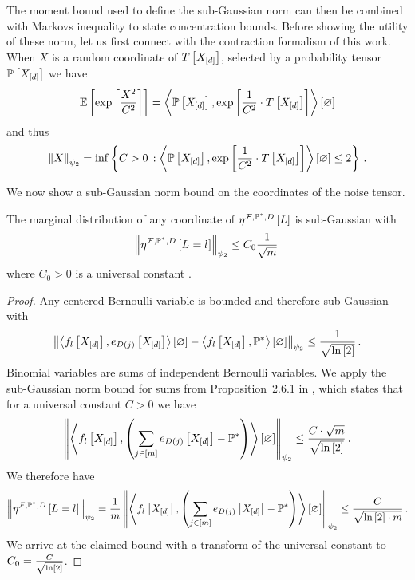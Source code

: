 The moment bound used to define the sub-Gaussian norm can then be combined with Markovs inequality to state concentration bounds.
Before showing the utility of these norm, let us first connect with the contraction formalism of this work.
When $X$ is a random coordinate of $T\left[X_{[d]}\right]$, selected by a probability tensor $\mathbb{P}\left[X_{[d]}\right]$ we have
\begin{align*}
    \mathbb{E}\left[\mathrm{exp}\left[\frac{X^2}{C^2}\right]\right]
    = \left\langle \mathbb{P}\left[X_{[d]}\right],\mathrm{exp}\left[\frac{1}{C^2}\cdot T\left[X_{[d]}\right]\right]\right\rangle \left[ \varnothing \right]
\end{align*}
and thus
\begin{align*}
    \left\|X\right\|_{\psi_2} = \inf \left\{ C > 0 \, : \left\langle \mathbb{P}\left[X_{[d]}\right],\mathrm{exp}\left[\frac{1}{C^2}\cdot T\left[X_{[d]}\right]\right]\right\rangle \left[ \varnothing \right] \leq 2 \right\} \, .
\end{align*}

We now show a sub-Gaussian norm bound on the coordinates of the noise tensor.

\begin{lemma}
    \label{lem:mlnMeanSubGaussianCoordinates}
    The marginal distribution of any coordinate of $\eta^{\mathcal{F},\mathbb{P}^*,D}\left[L\right]$ is sub-Gaussian with
    \begin{align*}
        \left\|\eta^{\mathcal{F},\mathbb{P}^*,D}\left[L_{}=l_{}\right]\right\|_{\psi_2} \leq C_0 \frac{1}{\sqrt{m}} \,
    \end{align*}
    where $C_0>0$ is a universal constant .
\end{lemma}
\begin{proof}
    Any centered Bernoulli variable is bounded and therefore sub-Gaussian with
    \begin{align*}
        \left\|\left\langle f_{l}\left[X_{[d]}\right],e_{D(j)}\left[X_{[d]}\right]\right\rangle \left[ \varnothing \right]-\left\langle f_{l}\left[X_{[d]}\right],\mathbb{P}^*\right\rangle \left[ \varnothing \right]\right\|_{\psi_2}
        \leq \frac{1}{\sqrt{\ln \left[ 2 \right]}} \, .
    \end{align*}
    Binomial variables are sums of independent Bernoulli variables.
    We apply the sub-Gaussian norm bound for sums from Proposition~2.6.1 in \cite{vershynin_high-dimensional_2018}, which states that for a universal constant $C>0$ we have
    \begin{align*}
        \left\|\left\langle f_{l}\left[X_{[d]}\right],\left(\sum_{j\in[m]}e_{D(j)}\left[X_{[d]}\right] - \mathbb{P}^*\right)\right\rangle \left[ \varnothing \right]\right\|_{\psi_2}
        \leq \frac{C\cdot\sqrt{m}}{\sqrt{\ln \left[ 2 \right]}} \, .
    \end{align*}
    We therefore have
    \begin{align*}
        \left\|\eta^{\mathcal{F},\mathbb{P}^*,D}\left[L_{}=l_{}\right]\right\|_{\psi_2} =
        \frac{1}{m}\left\|\left\langle f_{l}\left[X_{[d]}\right],\left(\sum_{j\in[m]}e_{D(j)}\left[X_{[d]}\right] - \mathbb{P}^*\right)\right\rangle \left[ \varnothing \right]\right\|_{\psi_2}
        \leq \frac{C}{\sqrt{\ln \left[ 2 \right] \cdot m}} \, .
    \end{align*}
    We arrive at the claimed bound with a transform of the universal constant to $C_0=\frac{C}{\sqrt{\ln \left[ 2 \right]}}$.
\end{proof}

